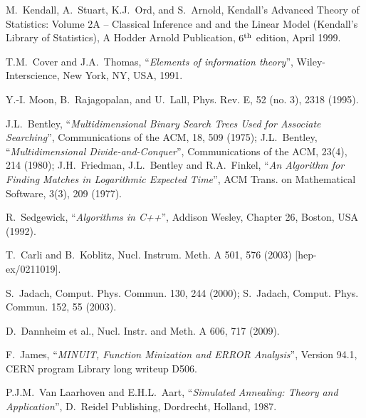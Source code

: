 \begin{thebibliography}{99}
                        M.~Kendall, A.~Stuart, K.J.~Ord, and S.~Arnold,
                        Kendall's Advanced Theory of Statistics: Volume 2A -- Classical
                        Inference and and the Linear Model (Kendall's Library of Statistics),
                        A Hodder Arnold Publication, $6^{\rm th}$ edition, April 1999.

                        T.M.~Cover and J.A.~Thomas,
                        ``{\em Elements of information theory}'',
                        Wiley-Interscience, New York, NY, USA, 1991.

                        Y.-I. Moon, B.~Rajagopalan, and U.~Lall,
                        Phys. Rev. E, 52 (no. 3), 2318 (1995).

       J.L.~Bentley, 
                        ``{\em Multidimensional Binary Search Trees Used for Associate Searching}'', 
                        Communications of the ACM, 18, 509 (1975); 
                        J.L.~Bentley, 
                        ``{\em Multidimensional Divide-and-Conquer}'', 
                        Communications of the ACM, 23(4), 214 (1980); 
                        J.H.~Friedman, J.L.~Bentley and R.A.~Finkel, 
                        ``{\em An Algorithm for Finding Matches in Logarithmic Expected Time}'', 
                        ACM Trans. on Mathematical Software, 3(3), 209 (1977).

    R.~Sedgewick, 
								``{\em Algorithms in C++}'', 
								Addison Wesley, Chapter 26, Boston, USA (1992).

	T.~Carli and B.~Koblitz,
								Nucl. Instrum. Meth. A 501, 576 (2003) [hep-ex/0211019].

         S.~Jadach, Comput. Phys. Commun. 130, 244 (2000); 
                        S.~Jadach, Comput. Phys. Commun. 152, 55 (2003).

       D.~Dannheim et al., Nucl. Instr. and Meth. A 606, 717 (2009).

        F.~James, ``{\em MINUIT, Function Minization and ERROR Analysis}'', 
                        Version 94.1, CERN program Library long writeup D506.

P.J.M.~Van Laarhoven and E.H.L.~Aart,  
                        ``{\em Simulated Annealing: Theory and Application}'',
                        D.~Reidel Publishing, Dordrecht, Holland, 1987.


\end{thebibliography}
